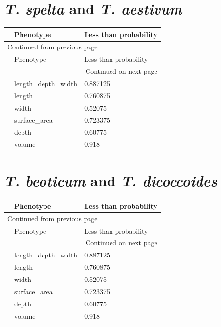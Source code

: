\documentclass[11pt]{report}
\begin{document}
\section{\emph{T. spelta} and \emph{T. aestivum}}
\label{sec:org64e73fa}
\begin{longtable}{l|l|l}
 & Phenotype & Less than probability\\
\hline
\endfirsthead
\multicolumn{3}{l}{Continued from previous page} \\
\hline

 & Phenotype & Less than probability \\

\hline
\endhead
\hline\multicolumn{3}{r}{Continued on next page} \\
\endfoot
\endlastfoot
\hline
 & length\_depth\_width & 0.887125\\
 & length & 0.760875\\
 & width & 0.52075\\
 & surface\_area & 0.723375\\
 & depth & 0.60775\\
 & volume & 0.918\\
\end{longtable}


\clearpage
\section{\emph{T. beoticum} and \emph{T. dicoccoides}}
\label{sec:org9e279c5}
\begin{longtable}{l|l|l}
 & Phenotype & Less than probability\\
\hline
\endfirsthead
\multicolumn{3}{l}{Continued from previous page} \\
\hline

 & Phenotype & Less than probability \\

\hline
\endhead
\hline\multicolumn{3}{r}{Continued on next page} \\
\endfoot
\endlastfoot
\hline
 & length\_depth\_width & 0.887125\\
 & length & 0.760875\\
 & width & 0.52075\\
 & surface\_area & 0.723375\\
 & depth & 0.60775\\
 & volume & 0.918\\
\end{longtable}
\end{document}
